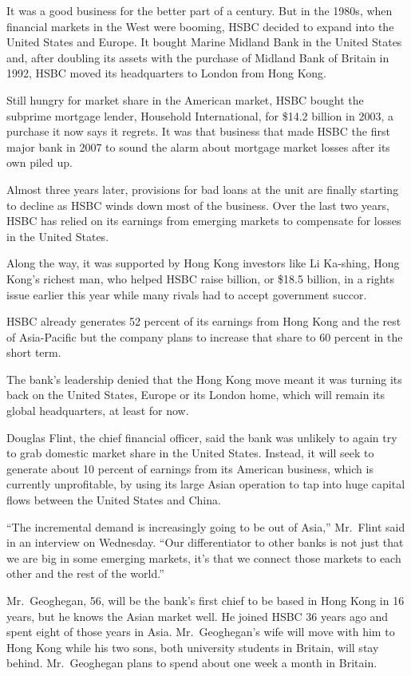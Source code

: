 ﻿\documentclass[12pt]{article}
\begin{document}
It was a good business for the better part of a century. But in the 1980s, when financial markets in
the West were booming, HSBC decided to expand into the United States and Europe. It bought Marine
Midland Bank in the United States and, after doubling its assets with the purchase of Midland Bank
of Britain in 1992, HSBC moved its headquarters to London from Hong Kong.

Still hungry for market share in the American market, HSBC bought the subprime mortgage lender,
Household International, for \$14.2 billion in 2003, a purchase it now says it regrets. It was that
business that made HSBC the first major bank in 2007 to sound the alarm about mortgage market losses
after its own piled up.

Almost three years later, provisions for bad loans at the unit are finally starting to decline as
HSBC winds down most of the business. Over the last two years, HSBC has relied on its earnings from
emerging markets to compensate for losses in the United States.

Along the way, it was supported by Hong Kong investors like Li Ka-shing, Hong Kong's richest man,
who helped HSBC raise  billion, or \$18.5 billion, in a rights issue earlier this
year while many rivals had to accept government succor.

HSBC already generates 52 percent of its earnings from Hong Kong and the rest of Asia-Pacific but
the company plans to increase that share to 60 percent in the short term.

The bank's leadership denied that the Hong Kong move meant it was turning its back on the United
States, Europe or its London home, which will remain its global headquarters, at least for now.

Douglas Flint, the chief financial officer, said the bank was unlikely to again try to grab domestic
market share in the United States. Instead, it will seek to generate about 10 percent of earnings
from its American business, which is currently unprofitable, by using its large Asian operation to
tap into huge capital flows between the United States and China.

``The incremental demand is increasingly going to be out of Asia,'' Mr.~Flint said in an interview
on Wednesday. ``Our differentiator to other banks is not just that we are big in some emerging
markets, it's that we connect those markets to each other and the rest of the world.''

Mr.~Geoghegan, 56, will be the bank's first chief to be based in Hong Kong in 16 years, but he knows
the Asian market well. He joined HSBC 36 years ago and spent eight of those years in Asia.
Mr.~Geoghegan's wife will move with him to Hong Kong while his two sons, both university students in
Britain, will stay behind. Mr.~Geoghegan plans to spend about one week a month in Britain.
\end{document}
